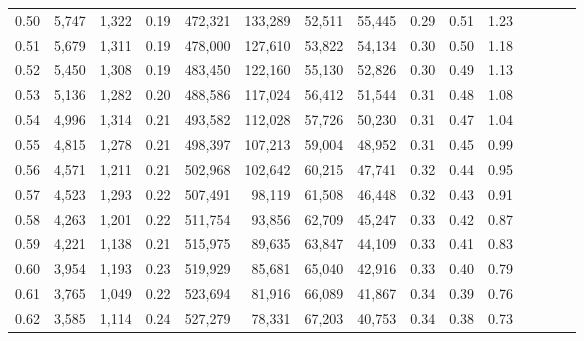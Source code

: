 \begin{tabular}{rrrcrrrrrrrrrrr}
0.50 &   5,747 &   1,322 &                                       0.19 &  472,321 &  133,289 &   52,511 &   55,445 &  0.29 &  0.51 &                         1.23 \\
0.51 &   5,679 &   1,311 &                                       0.19 &  478,000 &  127,610 &   53,822 &   54,134 &  0.30 &  0.50 &                         1.18 \\
0.52 &   5,450 &   1,308 &                                       0.19 &  483,450 &  122,160 &   55,130 &   52,826 &  0.30 &  0.49 &                         1.13 \\
0.53 &   5,136 &   1,282 &                                       0.20 &  488,586 &  117,024 &   56,412 &   51,544 &  0.31 &  0.48 &                         1.08 \\
0.54 &   4,996 &   1,314 &                                       0.21 &  493,582 &  112,028 &   57,726 &   50,230 &  0.31 &  0.47 &                         1.04 \\
0.55 &   4,815 &   1,278 &                                       0.21 &  498,397 &  107,213 &   59,004 &   48,952 &  0.31 &  0.45 &                         0.99 \\
0.56 &   4,571 &   1,211 &                                       0.21 &  502,968 &  102,642 &   60,215 &   47,741 &  0.32 &  0.44 &                         0.95 \\
0.57 &   4,523 &   1,293 &                                       0.22 &  507,491 &   98,119 &   61,508 &   46,448 &  0.32 &  0.43 &                         0.91 \\
0.58 &   4,263 &   1,201 &                                       0.22 &  511,754 &   93,856 &   62,709 &   45,247 &  0.33 &  0.42 &                         0.87 \\
0.59 &   4,221 &   1,138 &                                       0.21 &  515,975 &   89,635 &   63,847 &   44,109 &  0.33 &  0.41 &                         0.83 \\
0.60 &   3,954 &   1,193 &                                       0.23 &  519,929 &   85,681 &   65,040 &   42,916 &  0.33 &  0.40 &                         0.79 \\
0.61 &   3,765 &   1,049 &                                       0.22 &  523,694 &   81,916 &   66,089 &   41,867 &  0.34 &  0.39 &                         0.76 \\
0.62 &   3,585 &   1,114 &                                       0.24 &  527,279 &   78,331 &   67,203 &   40,753 &  0.34 &  0.38 &                         0.73 \\

\end{tabular}
